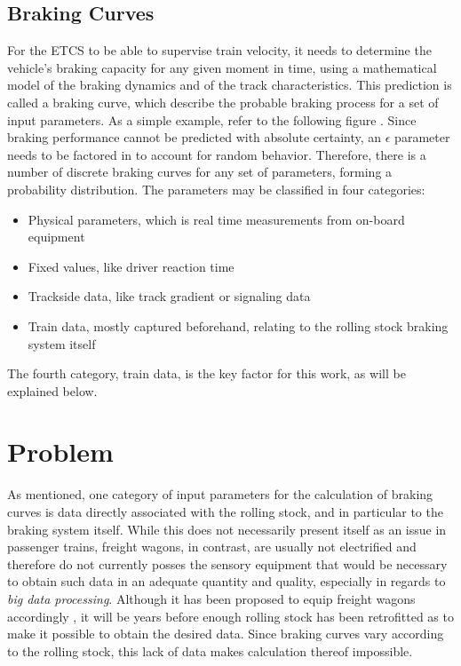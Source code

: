 \subsection{Braking Curves}
\label{sec:BrakingCurves}
\par\noindent
For the ETCS to be able to supervise train velocity, it needs to determine the vehicle's braking capacity for any given moment in time, using a mathematical model of the braking dynamics and of the track characteristics. This prediction is called a braking curve, which describe the probable braking process for a set of input parameters. As a simple example, refer to the following figure . Since braking performance cannot be predicted with absolute certainty, an $\epsilon$ parameter needs to be factored in to account for random behavior. Therefore, there is a number of discrete braking curves for any set of parameters, forming a probability distribution. The parameters may be classified in four categories:
\begin{itemize}
	\item Physical parameters, which is real time measurements from on-board equipment
	\item Fixed values, like driver reaction time
	\item Trackside data, like track gradient or signaling data
	\item Train data, mostly captured beforehand, relating to the rolling stock braking system itself
\end{itemize}
The fourth category, train data, is the key factor for this work, as will be explained below.

\section{Problem}
\label{sec:Problem}

\par\noindent
As mentioned, one category of input parameters for the calculation of braking curves is data directly associated with the rolling stock, and in particular to the braking system itself. While this does not necessarily present itself as an issue in passenger trains, freight wagons, in contrast, are usually not electrified and therefore do not currently posses the sensory equipment that would be necessary to obtain such data in an adequate quantity and quality, especially in regards to \emph{big data processing}. Although it has been proposed to equip freight wagons accordingly , it will be years before enough rolling stock has been retrofitted as to make it possible to obtain the desired data. Since braking curves vary according to the rolling stock, this lack of data makes calculation thereof impossible.

